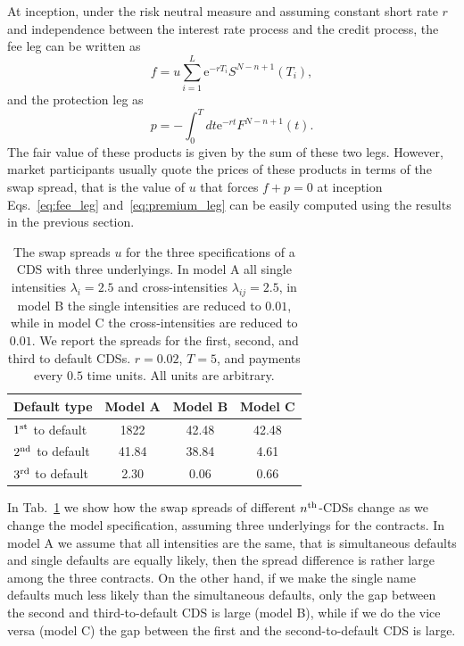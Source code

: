 \documentclass[a4paper,11pt]{amsart}
\theoremstyle{remark}
\newcommand{\ee}[1]{\mathrm{e}^{#1}}
\newcommand{\nth}{n\textsuperscript{th}}
\begin{document}
 At inception, under the risk neutral measure and assuming constant short rate $r$ and independence between the interest rate process and the credit process, the fee leg can be written as~\cite{giesecke_simple_2003, brigo_interest_2006}
 \begin{equation}
   \label{eq:fee_leg}
   f=u\sum_{i=1}^L\ee{-rT_i}S^{N-n+1}(T_i),
 \end{equation}
 and the protection leg as
 \begin{equation}
   \label{eq:premium_leg}
   p=-\int_0^Tdt \ee{-r t}F^{N-n+1}(t).
 \end{equation}
 The fair value of these products is given by the sum of these two legs. However, market participants usually quote the prices of these products in terms of the swap spread, that is the value of $u$ that forces $f+p=0$ at inception Eqs.~\eqref{eq:fee_leg} and~\eqref{eq:premium_leg} can be easily computed using the results in the previous section.
 \begin{table}[h!]
   \centering
   \begin{tabular}{lccc}
     \toprule
     Default type& Model A& Model B& Model C\\
     \midrule
     $1\textsuperscript{st}$ to default& 1822    &42.48 & 42.48\\
     $2\textsuperscript{nd}$ to default& 41.84   &38.84 & 4.61\\
     $3\textsuperscript{rd}$ to default& 2.30    &0.06  & 0.66\\
     \bottomrule
   \end{tabular}
   \caption{The swap spreads $u$ for the three specifications of a CDS with three underlyings. In model A all single intensities $\lambda_i=2.5$ and cross-intensities $\lambda_{ij}=2.5$, in model B the single intensities are reduced to $0.01$, while in model C the cross-intensities are reduced to $0.01$. We report the spreads for the first, second, and third to default CDSs. $r=0.02$, $T=5$, and payments every $0.5$ time units. All units are arbitrary.
   }
   \label{tab:swap_spreads}
 \end{table}
 In Tab.~\ref{tab:swap_spreads} we show how the swap spreads of different $\nth$-CDSs change as we change the model specification, assuming three underlyings for the contracts. In model A we assume that all intensities are the same, that is simultaneous defaults and single defaults are equally likely, then the spread difference is rather large among the three contracts. On the other hand, if we make the single name defaults much less likely than the simultaneous defaults, only the gap between the second and third-to-default CDS is large (model B), while if we do the vice versa (model C) the gap between the first and the second-to-default CDS is large.
\end{document}

